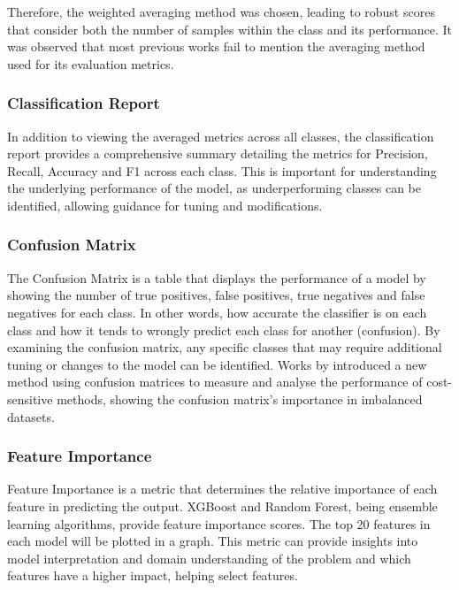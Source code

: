 Therefore, the weighted averaging method was chosen, leading to robust scores that consider both the number of samples within the class and its performance. It was observed that most previous works fail to mention the averaging method used for its evaluation metrics.

\subsubsection*{Classification Report}

In addition to viewing the averaged metrics across all classes, the classification report provides a comprehensive summary detailing the metrics for Precision, Recall, Accuracy and F1 across each class. This is important for understanding the underlying performance of the model, as underperforming classes can be identified, allowing guidance for tuning and modifications.

\subsubsection*{Confusion Matrix}

The Confusion Matrix is a table that displays the performance of a model by showing the number of true positives, false positives, true negatives and false negatives for each class. In other words, how accurate the classifier is on each class and how it tends to wrongly predict each class for another (confusion). By examining the confusion matrix, any specific classes that may require additional tuning or changes to the model can be identified. Works by \textcite{pmlr-v29-Koco13} introduced a new method using confusion matrices to measure and analyse the performance of cost-sensitive methods, showing the confusion matrix's importance in imbalanced datasets.


\subsubsection*{Feature Importance}
Feature Importance is a metric that determines the relative importance of each feature in predicting the output. XGBoost and Random Forest, being ensemble learning algorithms, provide feature importance scores. The top 20 features in each model will be plotted in a graph. This metric can provide insights into model interpretation and domain understanding of the problem and which features have a higher impact, helping select features. 